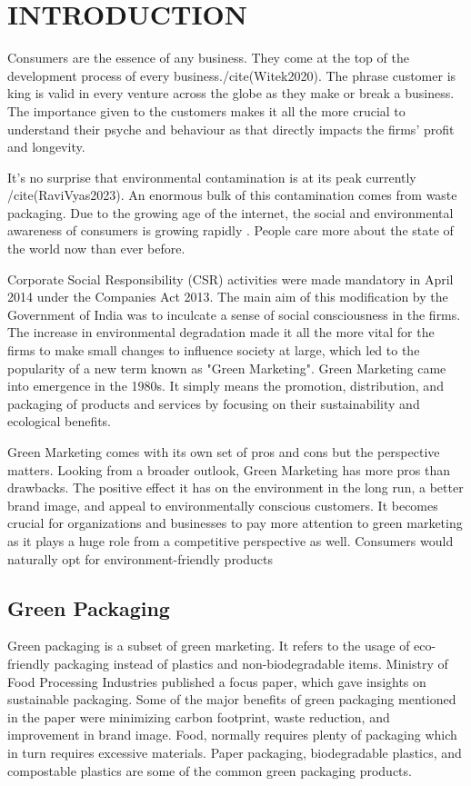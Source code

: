 \documentclass[a4paper,10pt]{article}
\begin{document}
\section{INTRODUCTION}

Consumers are the essence of any business. They come at the top of the development process of every business./cite(Witek2020). The phrase customer is king is valid in every venture across the globe as they make or break a business. The importance given to the customers makes it all the more crucial to understand their psyche and behaviour as that directly impacts the firms' profit and longevity. 


It's no surprise that environmental contamination is at its peak currently /cite(RaviVyas2023). An enormous bulk of this contamination comes from waste packaging. Due to the growing age of the internet, the social and environmental awareness of consumers is growing rapidly \cite{Groening2018}. People care more about the state of the world now than ever before. 

Corporate Social Responsibility (CSR) activities were made mandatory in April 2014 under the Companies Act 2013. The main aim of this modification by the Government of India was to inculcate a sense of social consciousness in the firms. The increase in environmental degradation made it all the more vital for the firms to make small changes to influence society at large, which led to the popularity of a new term known as "Green Marketing". Green Marketing came into emergence in the 1980s. It simply means the promotion, distribution, and packaging of products and services by focusing on their sustainability and ecological benefits. 

Green Marketing comes with its own set of pros and cons but the perspective matters. Looking from a broader outlook, Green Marketing has more pros than drawbacks. The positive effect it has on the environment in the long run, a better brand image, and appeal to environmentally conscious customers. It becomes crucial for organizations and businesses to pay more attention to green marketing as it plays a huge role from a competitive perspective as well. Consumers would naturally opt for environment-friendly products \cite{Groening2018}


\subsection{Green Packaging}

Green packaging is a subset of green marketing. It refers to the usage of eco-friendly packaging instead of plastics and non-biodegradable items. Ministry of Food Processing Industries published a focus paper, \cite{MOFPI2023} which gave insights on sustainable packaging. Some of the major benefits of green packaging mentioned in the paper were minimizing carbon footprint, waste reduction, and improvement in brand image. Food, normally requires plenty of packaging which in turn requires excessive materials. Paper packaging, biodegradable plastics, and compostable plastics are some of the common green packaging products.
\end{document}
